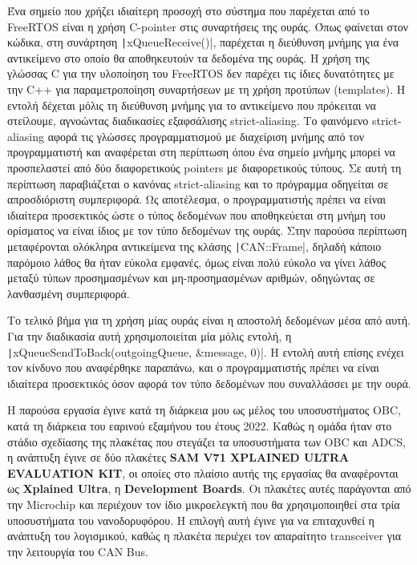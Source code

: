 \documentclass[a4paper,nobib,justified]{tufte-book}
\begin{document}
Ένα σημείο που χρήζει ιδιαίτερη προσοχή στο σύστημα που παρέχεται από το FreeRTOS είναι η χρήση C-pointer στις συναρτήσεις της ουράς. Όπως φαίνεται στον κώδικα, στη συνάρτηση \texttt|xQueueReceive()|, παρέχεται η διεύθυνση μνήμης για ένα αντικείμενο στο οποίο θα αποθηκευτούν τα δεδομένα της ουράς. Η χρήση της γλώσσας C για την υλοποίηση του FreeRTOS δεν παρέχει τις ίδιες δυνατότητες με την C++ για παραμετροποίηση συναρτήσεων με τη χρήση προτύπων (templates). Η εντολή δέχεται μόλις τη διεύθυνση μνήμης για το αντικείμενο που πρόκειται να στείλουμε, αγνοώντας διαδικασίες εξαφσάλισης strict-aliasing. Το φαινόμενο strict-aliasing αφορά τις γλώσσες προγραμματισμού με διαχείριση μνήμης από τον προγραμματιστή και αναφέρεται στη περίπτωση όπου ένα σημείο μνήμης μπορεί να προσπελαστεί από δύο διαφορετικούς pointers με διαφορετικούς τύπους. Σε αυτή τη περίπτωση παραβιάζεται ο κανόνας strict-aliasing και το πρόγραμμα οδηγείται σε απροσδιόριστη συμπεριφορά. Ως αποτέλεσμα, ο προγραμματιστής πρέπει να είναι ιδιαίτερα προσεκτικός ώστε ο τύπος δεδομένων που αποθηκεύεται στη μνήμη του ορίσματος να είναι ίδιος με τον τύπο δεδομένων της ουράς. Στην παρούσα περίπτωση μεταφέρονται ολόκληρα αντικείμενα της κλάσης \texttt|CAN::Frame|, δηλαδή κάποιο παρόμοιο λάθος θα ήταν εύκολα εμφανές, όμως είναι πολύ εύκολο να γίνει λάθος μεταξύ τύπων προσημασμένων και μη-προσημασμένων αριθμών, οδηγώντας σε λανθασμένη συμπεριφορά.

Το τελικό βήμα για τη χρήση μίας ουράς είναι η αποστολή δεδομένων μέσα από αυτή. Για την διαδικασία αυτή χρησιμοποιείται μία μόλις εντολή, η \texttt|xQueueSendToBack(outgoingQueue, &message, 0)|. Η εντολή αυτή επίσης ενέχει τον κίνδυνο που αναφέρθηκε παραπάνω, και ο προγραμματιστής πρέπει να είναι ιδιαίτερα προσεκτικός όσον αφορά τον τύπο δεδομένων που συναλλάσσει με την ουρά. 

Η παρούσα εργασία έγινε κατά τη διάρκεια μου ως μέλος του υποσυστήματος OBC, κατά τη διάρκεια του εαρινού εξαμήνου του έτους 2022. Καθώς η ομάδα ήταν στο στάδιο σχεδίασης της πλακέτας που στεγάζει τα υποσυστήματα των OBC και ADCS, η ανάπτυξη έγινε σε δύο πλακέτες \textbf{SAM V71 XPLAINED ULTRA EVALUATION KIT}, οι οποίες στο πλαίσιο αυτής της εργασίας θα αναφέρονται ως \textbf{Xplained Ultra}, η \textbf{Development Boards}. Οι πλακέτες αυτές παράγονται από την Microchip και περιέχουν τον ίδιο μικροελεγκτή που θα χρησιμοποιηθεί στα τρία υποσυστήματα του νανοδορυφόρου. Η επιλογή αυτή έγινε για να επιταχυνθεί η ανάπτυξη του λογισμικού, καθώς η πλακέτα περιέχει τον απαραίτητο transceiver για την λειτουργία του CAN Bus. 
\end{document}

